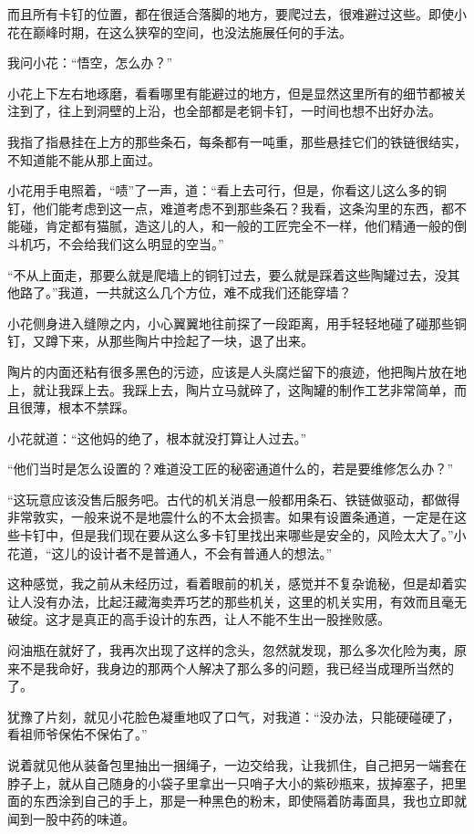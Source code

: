 而且所有卡钉的位置，都在很适合落脚的地方，要爬过去，很难避过这些。即使小花在巅峰时期，在这么狭窄的空间，也没法施展任何的手法。

我问小花：“悟空，怎么办？”

小花上下左右地琢磨，看看哪里有能避过的地方，但是显然这里所有的细节都被关注到了，往上到洞壁的上沿，也全部都是老铜卡钉，一时间也想不出好办法。

我指了指悬挂在上方的那些条石，每条都有一吨重，那些悬挂它们的铁链很结实，不知道能不能从那上面过。

小花用手电照着，“啧”了一声，道：“看上去可行，但是，你看这儿这么多的铜钉，他们能考虑到这一点，难道考虑不到那些条石？我看，这条沟里的东西，都不能碰，肯定都有猫腻，造这儿的人，和一般的工匠完全不一样，他们精通一般的倒斗机巧，不会给我们这么明显的空当。”

“不从上面走，那要么就是爬墙上的铜钉过去，要么就是踩着这些陶罐过去，没其他路了。”我道，一共就这么几个方位，难不成我们还能穿墙？

小花侧身进入缝隙之内，小心翼翼地往前探了一段距离，用手轻轻地碰了碰那些铜钉，又蹲下来，从那些陶片中捡起了一块，退了出来。

陶片的内面还粘有很多黑色的污迹，应该是人头腐烂留下的痕迹，他把陶片放在地上，就让我踩上去。我踩上去，陶片立马就碎了，这陶罐的制作工艺非常简单，而且很薄，根本不禁踩。

小花就道：“这他妈的绝了，根本就没打算让人过去。”

“他们当时是怎么设置的？难道没工匠的秘密通道什么的，若是要维修怎么办？”

“这玩意应该没售后服务吧。古代的机关消息一般都用条石、铁链做驱动，都做得非常敦实，一般来说不是地震什么的不太会损害。如果有设置条通道，一定是在这些卡钉中，但是我们现在要从这么多卡钉里找出来哪些是安全的，风险太大了。”小花道，“这儿的设计者不是普通人，不会有普通人的想法。”

这种感觉，我之前从未经历过，看着眼前的机关，感觉并不复杂诡秘，但是却着实让人没有办法，比起汪藏海卖弄巧艺的那些机关，这里的机关实用，有效而且毫无破绽。这才是真正的高手设计的东西，让人不能不生出一股挫败感。

闷油瓶在就好了，我再次出现了这样的念头，忽然就发现，那么多次化险为夷，原来不是我命好，我身边的那两个人解决了那么多的问题，我已经当成理所当然的了。

犹豫了片刻，就见小花脸色凝重地叹了口气，对我道：“没办法，只能硬碰硬了，看祖师爷保佑不保佑了。”

说着就见他从装备包里抽出一捆绳子，一边交给我，让我抓住，自己把另一端套在脖子上，就从自己随身的小袋子里拿出一只哨子大小的紫砂瓶来，拔掉塞子，把里面的东西涂到自己的手上，那是一种黑色的粉末，即使隔着防毒面具，我也立即就闻到一股中药的味道。

